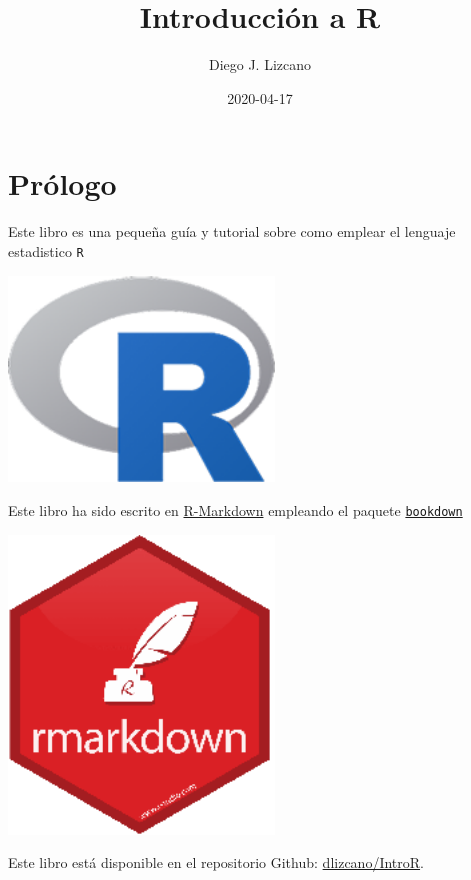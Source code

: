 \documentclass[
]{book}
\title{Introducción a R}
\author{Diego J. Lizcano}
\date{2020-04-17}
\begin{document}
\maketitle

{
\setcounter{tocdepth}{1}
\tableofcontents
}
\hypertarget{pruxf3logo}{%
\chapter*{Prólogo}\label{pruxf3logo}}

Este libro es una pequeña guía y tutorial sobre como emplear el lenguaje estadistico \texttt{R}

\begin{flushleft}\includegraphics[width=2.78in]{images/R} \end{flushleft}

Este libro ha sido escrito en \href{http://rmarkdown.rstudio.com}{R-Markdown} empleando el paquete \href{https://bookdown.org/yihui/bookdown/}{\texttt{bookdown}}

\begin{flushleft}\includegraphics[width=2.78in]{images/rmd} \end{flushleft}

Este libro está disponible en el repositorio Github: \href{https://github.com/dlizcano/IntroR}{dlizcano/IntroR}.
\end{document}
